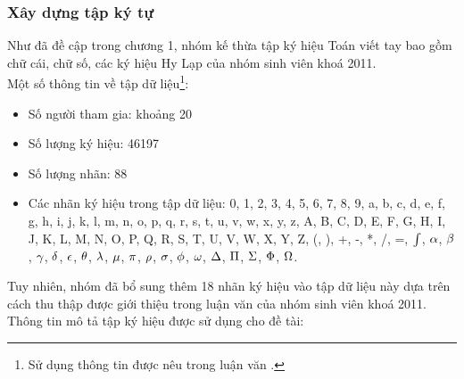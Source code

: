 \documentclass[a4paper,12pt]{article}
\begin{document}
	\subsubsection{Xây dựng tập ký tự}
	Như đã đề cập trong chương 1, nhóm kế thừa tập ký hiệu Toán viết tay bao gồm chữ cái, chữ số, các ký hiệu Hy Lạp của nhóm sinh viên khoá 2011\cite{qak}.\\
	Một số thông tin về tập dữ liệu\footnote{Sử dụng thông tin được nêu trong luận văn \cite{qak}.}:
	\begin{itemize}
		\item Số người tham gia: khoảng 20
		\item Số lượng ký hiệu: 46197
		\item Số lượng nhãn: 88
		\item Các nhãn ký hiệu trong tập dữ liệu: 0, 1, 2, 3, 4, 5, 6, 7, 8, 9, a, b, c, d, e, f, g, h, i,
		j, k, l, m, n, o, p, q, r, s, t, u, v, w, x, y, z, A, B, C, D, E, F, G, H, I, J, K, L, M, N, O, P, Q, R, S, T, U, V, W, X, Y, Z, (, ), +, -, *, /, =,  $\textcolor{black}{\int}$, $\textcolor{black}{\alpha}$, $\textcolor{black}{\beta}$, $\textcolor{black}{\gamma}$, $\textcolor{black}{\delta}$, $\textcolor{black}{\epsilon}$, $\textcolor{black}{\theta}$, $\textcolor{black}{\lambda}$, $\textcolor{black}{\mu}$, $\textcolor{black}{\pi}$, $\textcolor{black}{\rho}$, $\textcolor{black}{\sigma}$, $\textcolor{black}{\phi}$, $\textcolor{black}{\omega}$, $\textcolor{black}{\Delta}$, $\textcolor{black}{\Pi}$, $\textcolor{black}{\Sigma}$, $\textcolor{black}{\Phi}$, $\textcolor{black}{\Omega}$.
	\end{itemize}
	Tuy nhiên, nhóm đã bổ sung thêm 18 nhãn ký hiệu vào tập dữ liệu này dựa trên cách thu thập được giới thiệu trong luận văn của nhóm sinh viên khoá 2011\cite{qak}.\\
	Thông tin mô tả tập ký hiệu được sử dụng cho đề tài:
\end{document}
